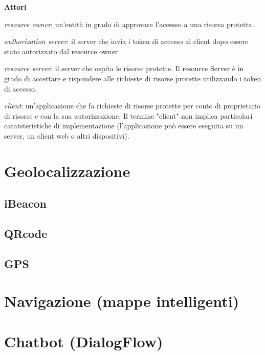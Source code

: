 \textbf{Attori}

\textit{resource owner}: un'entità in grado di approvare l'accesso a una risorsa protetta.

\textit{authorization server}: il server che invia i token di accesso al client dopo essere stato autorizzato
dal resource owner

\textit{resource server}: il server che ospita le risorse protette. Il resource Server è in grado di accettare
e rispondere alle richieste di risorse protette utilizzando i token di accesso.

\textit{client}: un'applicazione che fa richieste di risorse protette per conto di
proprietario di risorse e con la sua autorizzazione. Il termine "client"
non implica particolari caratsteristiche di implementazione (l'applicazione può essere eseguita
su un server, un client web o altri dispositivi).

\section{Geolocalizzazione}
\subsection{iBeacon}
\subsection{QRcode}
\subsection{GPS}
\section{Navigazione (mappe intelligenti)}
\section{Chatbot (DialogFlow)}
